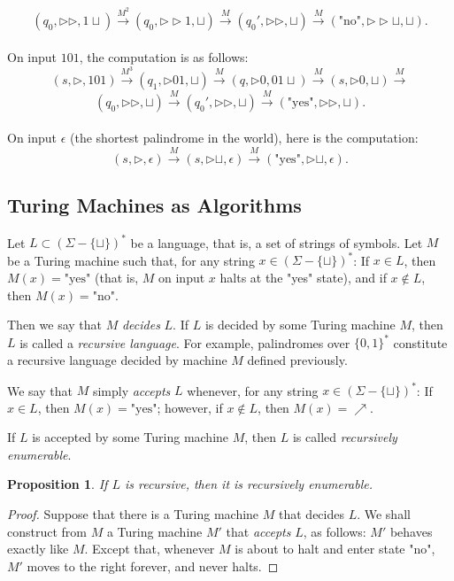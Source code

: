 \documentclass[12pt]{article}
\newtheorem*{proposition}{Proposition}
\newcommand{\tr}{\triangleright}
\begin{document}
$$ (q_0, \tr \tr, 1 \sqcup) \xrightarrow{M^2} (q_0, \tr \tr 1, \sqcup) \xrightarrow{M} (q_0', \tr \tr, \sqcup) \xrightarrow{M} (\text{"no"}, \tr \tr \sqcup, \sqcup).
$$
\\
On input $101$, the computation is as follows:
$$
(s, \tr, 101) \xrightarrow{M^3} (q_1, \tr 01, \sqcup) \xrightarrow{M} (q, \tr 0, 01 \sqcup) \xrightarrow{M} (s, \tr 0, \sqcup) \xrightarrow{M} $$
$$(q_0, \tr \tr, \sqcup) \xrightarrow{M} (q_0', \tr \tr, \sqcup) \xrightarrow{M} (\text{"yes"}, \tr \tr, \sqcup).
$$
\\
On input $\epsilon$ (the shortest palindrome in the world), here is the computation:
$$
(s, \tr, \epsilon) \xrightarrow{M} (s, \tr \sqcup, \epsilon) \xrightarrow{M} (\text{"yes"}, \tr \sqcup, \epsilon).
$$

\subsection{Turing Machines as Algorithms}
\begin{defbox}
Let $L \subset (\Sigma - \{\sqcup\})^*$ be a language, that is, a set of strings of symbols. Let $M$ be a Turing machine such that, for any string $x \in (\Sigma - \{\sqcup\})^*$:
If $x \in L$, then $M(x) = \text{"yes"}$ (that is, $M$ on input $x$ halts at the "yes" state),
and if $x \notin L$, then $M(x) = \text{"no"}$.

Then we say that $M$ \textit{decides} $L$. If $L$ is decided by some Turing machine $M$, then $L$ is called a \textit{recursive language}. For example, palindromes over $\{0,1\}^*$ constitute a recursive language decided by machine $M$ defined previously.

We say that $M$ simply \textit{accepts} $L$ whenever, for any string $x \in (\Sigma - \{\sqcup\})^*$:
If $x \in L$, then $M(x) = \text{"yes"}$;
however, if $x \notin L$, then $M(x) = \nearrow$.

If $L$ is accepted by some Turing machine $M$, then $L$ is called \textit{recursively enumerable}.
\end{defbox}

\begin{defbox}
\begin{proposition}
    If $L$ is recursive, then it is recursively enumerable.
\end{proposition}
\begin{proof}
    Suppose that there is a Turing machine $M$ that decides $L$. We shall construct from $M$ a Turing machine $M'$ that \textit{accepts} $L$, as follows: $M'$ behaves exactly like $M$. Except that, whenever $M$ is about to halt and enter state "no", $M'$ moves to the right forever, and never halts.
\end{proof}
\end{defbox}
\end{document}
